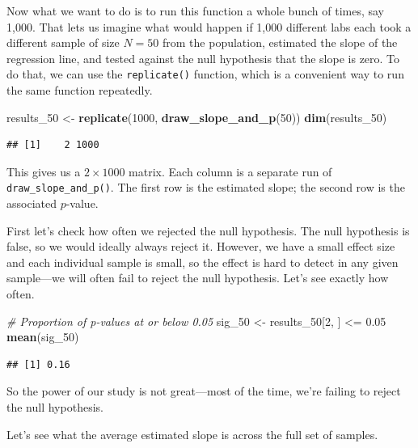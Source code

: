 \documentclass[12pt,oneside,openany]{book}
\newenvironment{Shaded}{\begin{snugshade}}{\end{snugshade}}
\newcommand{\KeywordTok}[1]{\textcolor[rgb]{0.13,0.29,0.53}{\textbf{{#1}}}}
\newcommand{\DecValTok}[1]{\textcolor[rgb]{0.00,0.00,0.81}{{#1}}}
\newcommand{\FloatTok}[1]{\textcolor[rgb]{0.00,0.00,0.81}{{#1}}}
\newcommand{\StringTok}[1]{\textcolor[rgb]{0.31,0.60,0.02}{{#1}}}
\newcommand{\CommentTok}[1]{\textcolor[rgb]{0.56,0.35,0.01}{\textit{{#1}}}}
\newcommand{\NormalTok}[1]{{#1}}
\begin{document}
Now what we want to do is to run this function a whole bunch of times,
say 1,000. That lets us imagine what would happen if 1,000 different
labs each took a different sample of size \(N = 50\) from the
population, estimated the slope of the regression line, and tested
against the null hypothesis that the slope is zero. To do that, we can
use the \texttt{replicate()} function, which is a convenient way to run
the same function repeatedly.

\begin{Shaded}
\begin{Highlighting}[]
\NormalTok{results_50 <-}\StringTok{ }\KeywordTok{replicate}\NormalTok{(}\DecValTok{1000}\NormalTok{, }\KeywordTok{draw_slope_and_p}\NormalTok{(}\DecValTok{50}\NormalTok{))}
\KeywordTok{dim}\NormalTok{(results_50)}
\end{Highlighting}
\end{Shaded}

\begin{verbatim}
## [1]    2 1000
\end{verbatim}

This gives us a \(2 \times 1000\) matrix. Each column is a separate run
of \texttt{draw\_slope\_and\_p()}. The first row is the estimated slope;
the second row is the associated \(p\)-value.

First let's check how often we rejected the null hypothesis. The null
hypothesis is false, so we would ideally always reject it. However, we
have a small effect size and each individual sample is small, so the
effect is hard to detect in any given sample---we will often fail to
reject the null hypothesis. Let's see exactly how often.

\begin{Shaded}
\begin{Highlighting}[]
\CommentTok{# Proportion of p-values at or below 0.05}
\NormalTok{sig_50 <-}\StringTok{ }\NormalTok{results_50[}\DecValTok{2}\NormalTok{, ] <=}\StringTok{ }\FloatTok{0.05}
\KeywordTok{mean}\NormalTok{(sig_50)}
\end{Highlighting}
\end{Shaded}

\begin{verbatim}
## [1] 0.16
\end{verbatim}

So the power of our study is not great---most of the time, we're failing
to reject the null hypothesis.

Let's see what the average estimated slope is across the full set of
samples.
\end{document}
